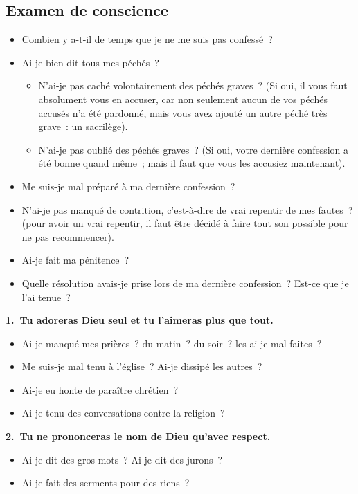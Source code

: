 \documentclass[%
a5paper%
,11pt%
,DIV=15%
,titlepage=on%
,headings=optiontoheadandtoc%
,headings=small%
,parskip=false%
,openany%
]{scrbook}
\newcommand{\commandement}[1]{\noindent\textbf{#1}}
\begin{document}
\subsection*{Examen de conscience}


\begin{itemize}
\item Combien y a-t-il de temps que je ne me suis pas confessé ?
\item Ai-je bien dit tous mes péchés ?
  \begin{itemize}
  \item N’ai-je pas caché volontairement des péchés graves ? (Si oui, il vous faut absolument vous en accuser, car non seulement aucun de vos péchés accusés n’a été pardonné, mais vous avez ajouté un autre péché très grave : un sacrilège).
  \item N’ai-je pas oublié des péchés graves ? (Si oui, votre dernière confession a été bonne quand même ; mais il faut que vous les accusiez maintenant).
  \end{itemize}
\item Me suis-je mal préparé à ma dernière confession ?
\item N’ai-je pas manqué de contrition, c’est-à-dire de vrai repentir de mes fautes ? (pour avoir un vrai repentir, il faut être décidé à faire tout son possible pour ne pas recommencer).
\item Ai-je fait ma pénitence ?
\item Quelle résolution avais-je prise lors de ma dernière confession ? Est-ce que je l’ai tenue ?
\end{itemize}


\commandement{1. Tu adoreras Dieu seul et tu l'aimeras plus que tout.}

\begin{itemize}
\item Ai-je manqué mes prières ? du matin ? du soir ? les ai-je mal faites ?
\item Me suis-je mal tenu à l’église ? Ai-je dissipé les autres ?
\item Ai-je eu honte de paraître chrétien ?
\item Ai-je tenu des conversations contre la religion ?
\end{itemize}

\commandement{2. Tu ne prononceras le nom de Dieu qu’avec respect.}
\begin{itemize}
\item Ai-je dit des gros mots ? Ai-je dit des jurons ?
\item Ai-je fait des serments pour des riens ?
\end{itemize}
\end{document}
